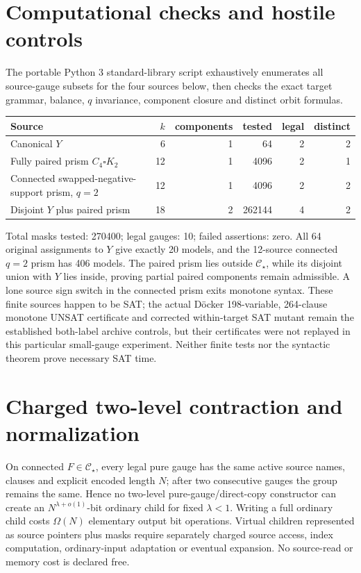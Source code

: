 \documentclass[11pt]{article}
\begin{document}
\section{Computational checks and hostile controls}
The portable Python 3 standard-library script exhaustively
enumerates all source-gauge subsets for the four sources below,
then checks the exact target grammar, balance, $q$ invariance,
component closure and distinct orbit formulas.
\begin{center}\small
\begin{tabular}{lrrrrr}
\toprule
Source & $k$ & components & tested & legal & distinct\\
\midrule
Canonical $Y$ & 6 & 1 & 64 & 2 & 2\\
Fully paired prism $C_4\square K_2$ & 12 & 1 & 4096 & 2 & 1\\
Connected swapped-negative-support prism, $q=2$ & 12 & 1 &
4096 & 2 & 2\\
Disjoint $Y$ plus paired prism & 18 & 2 & 262144 & 4 & 2\\
\bottomrule
\end{tabular}
\end{center}
Total masks tested: 270400; legal gauges: 10; failed
assertions: zero. All 64 original assignments to $Y$
give exactly 20 models, and the 12-source connected
$q=2$ prism has 406 models. The paired prism lies
outside $\mathcal C_\star$, while its disjoint union
with $Y$ lies inside, proving partial paired
components remain admissible. A lone source sign
switch in the connected prism exits monotone syntax.
These finite sources happen to be SAT; the actual
D\"ocker 198-variable, 264-clause monotone UNSAT
certificate and corrected within-target SAT mutant
remain the established both-label archive controls,
but their certificates were not replayed in this
particular small-gauge experiment. Neither finite
tests nor the syntactic theorem prove necessary SAT time.

\section{Charged two-level contraction and normalization}
On connected $F\in\mathcal C_\star$, every legal pure
gauge has the same active source names, clauses and
explicit encoded length $N$; after two consecutive
gauges the group remains the same. Hence no two-level
pure-gauge/direct-copy constructor can create an
$N^{\lambda+o(1)}$-bit ordinary child for fixed
$\lambda<1$. Writing a full ordinary child costs
$\Omega(N)$ elementary output bit operations.
Virtual children represented as source pointers plus
masks require separately charged source access,
index computation, ordinary-input adaptation
or eventual expansion. No source-read or memory
cost is declared free.
\end{document}
